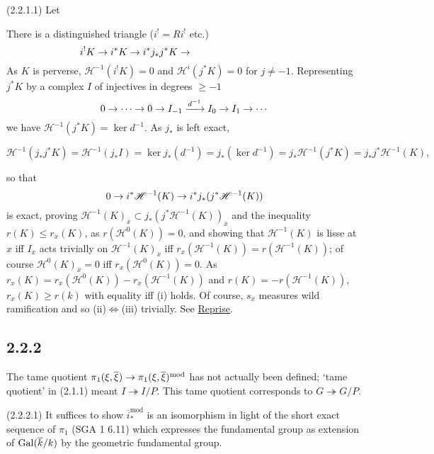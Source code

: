 \documentclass[deligne.tex]{subfiles}
\begin{document}
(2.2.1.1) Let
There is a distinguished triangle
($i^!=Ri^!$ etc.)
\begin{equation*}
	i^!K\ra i^*K\ra i^*j_*j^*K\ra
	\hspace{100pt}
\end{equation*}
As $K$ is perverse, $\mathscr H^{-1}(i^!K)=0$ and $\mathscr H^i(j^*K)=0$
for $j\ne-1$. Representing $j^*K$ by a complex $I$ of injectives in degrees
$\geq-1$
\begin{equation*}
	0\rightarrow\cdots\rightarrow0\rightarrow I_{-1}\xrightarrow{d^{-1}}I_0\rightarrow I_1\rightarrow\cdots
\end{equation*}
we have $\mathscr H^{-1}(j^*K)=\ker d^{-1}$. As $j_*$ is left exact,
\begin{ceqn}\begin{equation*}
	\mathscr H^{-1}(j_*j^*K)=\mathscr H^{-1}(j_*I)=\ker j_*(d^{-1})
	=j_*(\ker d^{-1})=j_*\mathscr H^{-1}(j^*K)=j_*j^*\mathscr H^{-1}(K),
\end{equation*}\end{ceqn}
so that
\begin{equation*}
	0\rightarrow i^*\mathscr H^{-1}(K)\rightarrow i^*j_*(j^*\mathscr H^{-1}(K))
\end{equation*}
is exact, proving
$\mathscr H^{-1}(K)_{\overline x}\subset j_*(j^*\mathscr H^{-1}(K))_{\overline x}$
and the inequality $r(K)\leq r_x(K)$, as
$r(\mathscr H^0(K))=0$, and showing that
$\mathscr H^{-1}(K)$ is lisse at $x$ iff
$I_x$ acts trivially on $\mathscr H^{-1}(K)_{\overline x}$ iff
$r_x(\mathscr H^{-1}(K))=r(\mathscr H^{-1}(K))$; of course
$\mathscr H^0(K)_{\overline x}=0$ iff $r_x(\mathscr H^0(K))=0$.
As $r_x(K)=r_x(\mathscr H^0(K))-r_x(\mathscr H^{-1}(K))$ and
$r(K)=-r(\mathscr H^{-1}(K))$, $r_x(K)\geq r(k)$ with equality iff
(i) holds. Of course, $s_x$ measures wild ramification and so
(ii)$\Leftrightarrow$(iii) trivially.
See \hyperref[laumon:reprise]{Reprise}.

\subsection*{2.2.2}\label{laumon:2.2.2} The tame quotient
$\pi_1(\xi,\overline\xi)\rightarrow\pi_1(\xi,\overline\xi)^{\mathrm{mod}}$
has not actually been defined; `tame quotient' in (2.1.1) meant
$I\twoheadrightarrow I/P$. This tame quotient corresponds to
$G\twoheadrightarrow G/P$.

(2.2.2.1) It suffices to show $\overline i_*^{\mathrm{mod}}$ is an
isomorphism in light of the short exact sequence of $\pi_1$ (SGA 1 6.11) 
which expresses the fundamental group as extension of $\operatorname{Gal}(\overline k/k)$ 
by the geometric fundamental group.
\end{document}
